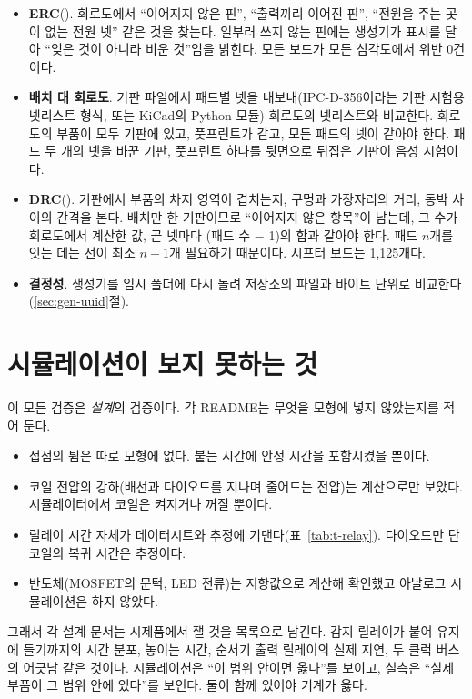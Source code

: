 \begin{itemize}
\item \textbf{ERC}(). 회로도에서 ``이어지지 않은 핀'', ``출력끼리 이어진
핀'', ``전원을 주는 곳이 없는 전원 넷'' 같은 것을 찾는다. 일부러 쓰지 않는 핀에는 생성기가  표시를
달아 ``잊은 것이 아니라 비운 것''임을 밝힌다. 모든 보드가 모든 심각도에서 위반 0건이다.
\item \textbf{배치 대 회로도}. 기판 파일에서 패드별 넷을 내보내(IPC-D-356이라는 기판 시험용 넷리스트 형식, 또는
KiCad의 Python 모듈) 회로도의 넷리스트와 비교한다. 회로도의 부품이 모두 기판에 있고, 풋프린트가 같고, 모든 패드의
넷이 같아야 한다. 패드 두 개의 넷을 바꾼 기판, 풋프린트 하나를 뒷면으로 뒤집은 기판이 음성 시험이다.
\item \textbf{DRC}(). 기판에서 부품의 차지 영역이 겹치는지, 구멍과 가장자리의
거리, 동박 사이의 간격을 본다. 배치만 한 기판이므로 ``이어지지 않은 항목''이 남는데, 그 수가 회로도에서 계산한
값, 곧 넷마다 (패드 수 $-$ 1)의 합과 같아야 한다. 패드 $n$개를 잇는 데는 선이 최소 $n-1$개 필요하기 때문이다.
시프터 보드는 1,125개다.
\item \textbf{결정성}. 생성기를 임시 폴더에 다시 돌려 저장소의 파일과 바이트 단위로 비교한다(\ref{sec:gen-uuid}절).
\end{itemize}

\section{시뮬레이션이 보지 못하는 것}

이 모든 검증은 \emph{설계}의 검증이다. 각 README는 무엇을 모형에 넣지 않았는지를 적어 둔다.

\begin{itemize}
\item 접점의 튐은 따로 모형에 없다. 붙는 시간에 안정 시간을 포함시켰을 뿐이다.
\item 코일 전압의 강하(배선과 다이오드를 지나며 줄어드는 전압)는 계산으로만 보았다. 시뮬레이터에서 코일은 켜지거나
꺼질 뿐이다.
\item 릴레이 시간 자체가 데이터시트와 추정에 기댄다(표~\ref{tab:t-relay}). 다이오드만 단 코일의 복귀 시간은 추정이다.
\item 반도체(MOSFET의 문턱, LED 전류)는 저항값으로 계산해 확인했고 아날로그 시뮬레이션은 하지 않았다.
\end{itemize}

그래서 각 설계 문서는 시제품에서 잴 것을 목록으로 남긴다. 감지 릴레이가 붙어 유지에 들기까지의 시간 분포,
놓이는 시간, 순서기 출력 릴레이의 실제 지연, 두 클럭 버스의 어긋남 같은 것이다. 시뮬레이션은 ``이 범위 안이면
옳다''를 보이고, 실측은 ``실제 부품이 그 범위 안에 있다''를 보인다. 둘이 함께 있어야 기계가 옳다.

